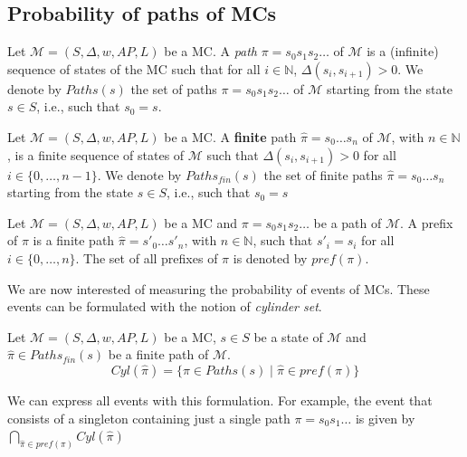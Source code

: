 \subsection{Probability of paths of MCs}

\begin{definition} Let $\mathcal{M} = (S, \Delta, w, AP, L)$ be a MC.
A \textit{path} $\pi = s_0 s_1 s_2 \dots$ of $\mathcal{M}$ is a (infinite) sequence of states of the MC such that for all $i \in \mathbb{N}$, $\Delta(s_i, s_{i+1})> 0$. We denote by $Paths(s)$ the set of paths $\pi = s_0s_1s_2\dots$ of $\mathcal{M}$ starting from the state $s \in S$, i.e., such that $s_0 = s$.
\end{definition}
\begin{definition}
Let $\mathcal{M} = (S, \Delta, w, AP, L)$ be a MC.
A \textbf{finite} path $\hat{\pi} = s_0 \dots s_n$ of $\mathcal{M}$, with $n \in \mathbb{N}$, is a finite sequence of states of $\mathcal{M}$ such that $\Delta(s_i, s_{i+1}) > 0$ for all $i \in \{0, \dots, n-1\}$.
We denote by $Paths_{fin}(s)$ the set of finite paths $\hat{\pi} = s_0 \dots s_n$ starting from the state $s \in S$, i.e., such that $s_0 = s$
\end{definition}
\begin{definition}
Let $\mathcal{M} = (S, \Delta, w, AP, L)$ be a MC and $\pi = s_0s_1s_2 \dots$ be a path of $\mathcal{M}$. A prefix of $\pi$ is a finite path $\hat{\pi} = s'_0 \dots s'_n$, with $n \in \mathbb{N}$, such that $s'_i = s_i$ for all $i \in \{0, \dots, n\}$.
The set of all prefixes of $\pi$ is denoted by $pref(\pi)$.
\end{definition}

We are now interested of measuring the probability of events of MCs. These events can be formulated with the notion of \textit{cylinder set}.

\begin{definition}
Let $\mathcal{M} = (S, \Delta, w, AP, L)$ be a MC, $s \in S$ be a state of $\mathcal{M}$ and $\hat{\pi} \in Paths_{fin}(s)$ be a finite path of $\mathcal{M}$.
\[Cyl(\hat{\pi})=\{\pi\in Paths(s)\;|\;\hat{\pi}\in pref(\pi) \} \]
\end{definition}

We can express all events with this formulation. For example, the event that consists of a singleton containing just a single path $\pi = s_0s_1\dots$ is given by $\bigcap_{\hat{\pi} \in pref(\pi)} Cyl(\hat{\pi})$

